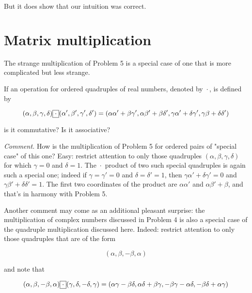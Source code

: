 But it does show that our intuition was correct.

\section{Matrix multiplication}

The strange multiplication of Problem 5 is a special case of one that is more complicated but less strange.

\begin{problem}
If an operation for ordered quadruples of real numbers, denoted by $\boxed{\cdot}$, is defined by

\begin{equation}
    (\alpha, \beta, \gamma, \delta) \boxed{\cdot} (\alpha', \beta', \gamma', \delta') \\
    = (\alpha\alpha' + \beta\gamma', \alpha\beta' + \beta\delta', \gamma\alpha' + \delta\gamma', \gamma\beta + \delta\delta')
\end{equation}

is it commutative? Is it associative?
\end{problem}

\textit{Comment.} How is the multiplication of Problem 5 for ordered pairs of "special case" of this one? Easy: restrict attention to only those quadruples $(\alpha, \beta, \gamma, \delta)$ for which $\gamma = 0$ and $\delta = 1$. The $\boxed{\cdot}$ product of two such special quadruples is again such a special one; indeed if $\gamma = \gamma' = 0$ and $\delta = \delta' = 1$, then $\gamma\alpha' + \delta\gamma' = 0$ and $\gamma\beta' + \delta\delta' = 1$. The first two coordinates of the product are $\alpha\alpha'$ and $\alpha\beta' + \beta$, and that's in harmony with Problem 5.

Another comment may come as an additional pleasant surprise: the multiplication of complex numbers discussed in Problem 4 is also a special case of the quadruple multiplication discussed here. Indeed: restrict attention to only those quadruples that are of the form

\begin{equation}
    (\alpha, \beta, -\beta, \alpha)
\end{equation}

and note that

\begin{equation}
    (\alpha, \beta, -\beta, \alpha) \boxed{\cdot} (\gamma, \delta, -\delta, \gamma)                                      \\
    = (\alpha\gamma - \beta\delta, \alpha\delta + \beta\gamma, -\beta\gamma - \alpha\delta, -\beta\delta + \alpha\gamma)
\end{equation}

